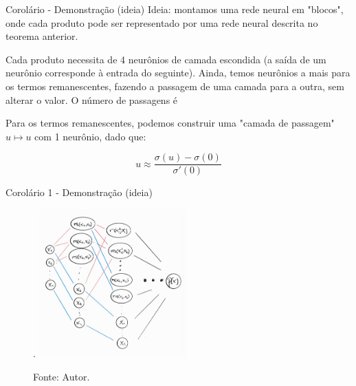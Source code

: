 \documentclass{beamer}
\begin{document}
\begin{frame}{Corolário - Demonstração (ideia)}
    \small
    Ideia: montamos uma rede neural em "blocos", onde cada produto pode ser representado por uma rede neural descrita no teorema anterior.
    
    \vspace{1em}

    Cada produto necessita de 4 neurônios de camada escondida (a saída de um neurônio corresponde à entrada do seguinte). Ainda, temos neurônios a mais para os termos remanescentes, fazendo a passagem de uma camada para a outra, sem alterar o valor. O número de passagens é 

    
    \pause 
    \vspace{1em}

    Para os termos remanescentes, podemos construir uma "camada de passagem" $u \mapsto u$ com 1 neurônio, dado que:

    \[
        u \approx \frac{\sigma(u) - \sigma(0)}{\sigma'(0)}
    \]
\end{frame}

\begin{frame}{Corolário 1 - Demonstração (ideia)}
    
    \begin{figure}
        \caption{Ilustração da rede construída: em \textcolor{red}{vermelho}, conexões de produto (4 neurônios); em \textcolor{blue}{azul}, camadas de passagem (1 neurônio)}.
        \includegraphics[width=0.5\textwidth]{fig/rede-corolario.jpeg}
        \caption*{Fonte: Autor.}
    \end{figure}

\end{frame}
\end{document}
